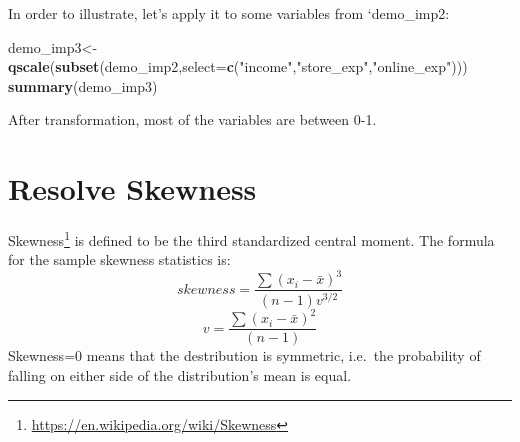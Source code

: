 \documentclass[12pt,]{krantz}
\makeatletter
\newenvironment{Shaded}{\begin{snugshade}}{\end{snugshade}}
\newcommand{\KeywordTok}[1]{\textcolor[rgb]{0.27,0.27,0.27}{\textbf{#1}}}
\newcommand{\DataTypeTok}[1]{\textcolor[rgb]{0.27,0.27,0.27}{#1}}
\newcommand{\DecValTok}[1]{\textcolor[rgb]{0.06,0.06,0.06}{#1}}
\newcommand{\StringTok}[1]{\textcolor[rgb]{0.5,0.5,0.5}{#1}}
\newcommand{\CommentTok}[1]{\textcolor[rgb]{0.37,0.37,0.37}{\textit{#1}}}
\newcommand{\OperatorTok}[1]{\textcolor[rgb]{0.43,0.43,0.43}{\textbf{#1}}}
\newcommand{\NormalTok}[1]{#1}
\renewcommand{\href}[2]{#2\footnote{\url{#1}}}
\newenvironment{kframe}{%
\medskip{}
\setlength{\fboxsep}{.8em}
 \def\at@end@of@kframe{}%
 \ifinner\ifhmode%
  \def\at@end@of@kframe{\end{minipage}}%
  \begin{minipage}{\columnwidth}%
 \fi\fi%
 \def\FrameCommand##1{\hskip\@totalleftmargin \hskip-\fboxsep
 \colorbox{shadecolor}{##1}\hskip-\fboxsep
     \hskip-\linewidth \hskip-\@totalleftmargin \hskip\columnwidth}%
 \MakeFramed {\advance\hsize-\width
   \@totalleftmargin\z@ \linewidth\hsize
   \@setminipage}}%
 {\par\unskip\endMakeFramed%
 \at@end@of@kframe}
\renewenvironment{Shaded}{\begin{kframe}}{\end{kframe}}
\theoremstyle{definition}
\theoremstyle{definition}
\theoremstyle{definition}
\theoremstyle{remark}
\makeatother
\begin{document}
In order to illustrate, let's apply it to some variables from
`demo\_imp2:

\begin{Shaded}
\begin{Highlighting}[]
\NormalTok{demo_imp3<-}\KeywordTok{qscale}\NormalTok{(}\KeywordTok{subset}\NormalTok{(demo_imp2,}\DataTypeTok{select=}\KeywordTok{c}\NormalTok{(}\StringTok{"income"}\NormalTok{,}\StringTok{"store_exp"}\NormalTok{,}\StringTok{"online_exp"}\NormalTok{)))}
\KeywordTok{summary}\NormalTok{(demo_imp3)}
\end{Highlighting}
\end{Shaded}

After transformation, most of the variables are between 0-1.

\section{Resolve Skewness}\label{resolve-skewness}

\href{https://en.wikipedia.org/wiki/Skewness}{Skewness} is defined to be
the third standardized central moment. The formula for the sample
skewness statistics is:
\[ skewness=\frac{\sum(x_{i}-\bar{x})^{3}}{(n-1)v^{3/2}}\]
\[v=\frac{\sum(x_{i}-\bar{x})^{2}}{(n-1)}\] Skewness=0 means that the
destribution is symmetric, i.e.~the probability of falling on either
side of the distribution's mean is equal.

\begin{Shaded}
\end{Shaded}
\end{document}
